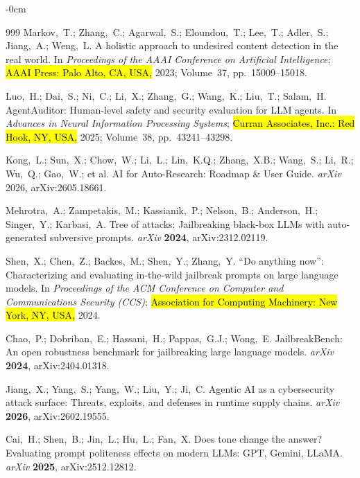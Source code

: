 \documentclass[superintelligence,article,accept,moreauthors]{Definitions/mdpi}
\begin{document}
\begin{adjustwidth}{-\extralength}{0cm}
{\begin{thebibliography}{999}
Markov,~T.; Zhang,~C.; Agarwal,~S.; Eloundou,~T.; Lee,~T.; Adler,~S.; Jiang,~A.; Weng,~L.
A holistic approach to undesired content detection in the real world.
In {\em Proceedings of the AAAI Conference on Artificial Intelligence}; \hl{AAAI Press: Palo Alto, CA, USA,} 2023; Volume~37, pp.~15009--15018.


Luo,~H.; Dai,~S.; Ni,~C.; Li,~X.; Zhang,~G.; Wang,~K.; Liu,~T.; Salam,~H.
{AgentAuditor}: Human-level safety and security evaluation for {LLM} agents.
In {\em Advances in Neural Information Processing Systems}; \hl{Curran Associates, Inc.: Red Hook, NY, USA,} {2025}; Volume~38, pp.~43241--43298.

Kong,~L.; Sun,~X.; Chow,~W.; Li,~L.; Lin,~K.Q.; Zhang,~X.B.; Wang,~S.; Li,~R.; Wu,~Q.; Gao,~W.; et al.
AI for Auto-Research: Roadmap \& User Guide.
{\em arXiv} 2026, arXiv:2605.18661.

Mehrotra,~A.; Zampetakis,~M.; Kassianik,~P.; Nelson,~B.; Anderson,~H.; Singer,~Y.; Karbasi,~A.
Tree of attacks: Jailbreaking black-box {LLMs} with auto-generated subversive prompts.
{\em arXiv} {\bf 2024}, arXiv:2312.02119.


Shen,~X.; Chen,~Z.; Backes,~M.; Shen,~Y.; Zhang,~Y.
``{D}o anything now'': Characterizing and evaluating in-the-wild jailbreak prompts on large language models.
In {\em Proceedings of the ACM Conference on Computer and Communications Security (CCS)}; \hl{Association for Computing Machinery: New York, NY, USA,} 2024.

Chao,~P.; Dobriban,~E.; Hassani,~H.; Pappas,~G.J.; Wong,~E.
{JailbreakBench}: An open robustness benchmark for jailbreaking large language models.
{\em arXiv} {\bf 2024}, arXiv:2404.01318.

Jiang,~X.; Yang,~S.; Yang,~W.; Liu,~Y.; Ji,~C.
Agentic {AI} as a cybersecurity attack surface: Threats, exploits, and defenses in runtime supply chains.
{\em arXiv} {\bf 2026}, arXiv:2602.19555.

Cai,~H.; Shen,~B.; Jin,~L.; Hu,~L.; Fan,~X.
Does tone change the answer? {E}valuating prompt politeness effects on modern {LLMs}: {GPT}, {Gemini}, {LLaMA}.
{\em arXiv} {\bf 2025}, arXiv:2512.12812.


\end{thebibliography}}
\end{adjustwidth}
\end{document}
